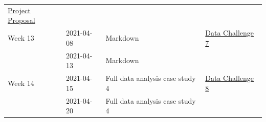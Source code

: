 \documentclass[
]{book}
\begin{document}
\begin{longtable}[]{@{}llll@{}}
\begin{minipage}[t]{0.22\columnwidth}
\href{final_project_docs/esoc214_project_proposal.pdf}{Project Proposal}\strut
\end{minipage}\tabularnewline
\begin{minipage}[t]{0.22\columnwidth}\raggedright
Week 13\strut
\end{minipage} & \begin{minipage}[t]{0.22\columnwidth}\raggedright
2021-04-08\strut
\end{minipage} & \begin{minipage}[t]{0.22\columnwidth}\raggedright
Markdown\strut
\end{minipage} & \begin{minipage}[t]{0.22\columnwidth}\raggedright
\href{}{Data Challenge 7}\strut
\end{minipage}\tabularnewline
\begin{minipage}[t]{0.22\columnwidth}\raggedright
\strut
\end{minipage} & \begin{minipage}[t]{0.22\columnwidth}\raggedright
2021-04-13\strut
\end{minipage} & \begin{minipage}[t]{0.22\columnwidth}\raggedright
Markdown\strut
\end{minipage} & \begin{minipage}[t]{0.22\columnwidth}\raggedright
\strut
\end{minipage}\tabularnewline
\begin{minipage}[t]{0.22\columnwidth}\raggedright
Week 14\strut
\end{minipage} & \begin{minipage}[t]{0.22\columnwidth}\raggedright
2021-04-15\strut
\end{minipage} & \begin{minipage}[t]{0.22\columnwidth}\raggedright
Full data analysis case study 4\strut
\end{minipage} & \begin{minipage}[t]{0.22\columnwidth}\raggedright
\href{}{Data Challenge 8}\strut
\end{minipage}\tabularnewline
\begin{minipage}[t]{0.22\columnwidth}\raggedright
\strut
\end{minipage} & \begin{minipage}[t]{0.22\columnwidth}\raggedright
2021-04-20\strut
\end{minipage} & \begin{minipage}[t]{0.22\columnwidth}\raggedright
Full data analysis case study 4\strut

\end{minipage}
\end{longtable}
\end{document}
